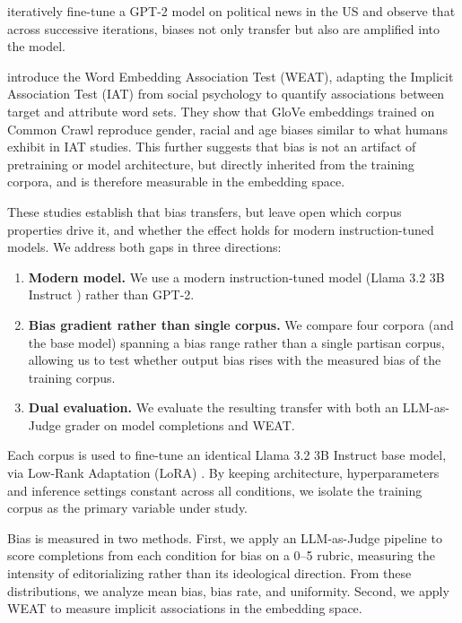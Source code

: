 \documentclass[11pt]{article}
\begin{document}
\citet{wang2024bias} iteratively fine-tune a GPT-2 model on political news in the US and observe that across successive iterations, biases not only transfer but also are amplified into the model.

\citet{caliskan2017} introduce the Word Embedding Association Test (WEAT), adapting the Implicit Association Test (IAT) from social psychology to quantify associations between target and attribute word sets.
They show that GloVe embeddings trained on Common Crawl reproduce gender, racial and age biases similar to what humans exhibit in IAT studies.
This further suggests that bias is not an artifact of pretraining or model architecture, but directly inherited from the training corpora, and is therefore measurable in the embedding space. 

These studies establish that bias transfers, but leave open which corpus properties drive it, and whether the effect holds for modern instruction-tuned models.
We address both gaps in three directions:
\begin{enumerate}
  \item \textbf{Modern model.} We use a modern instruction-tuned model (Llama 3.2 3B Instruct \cite{meta2024llama32}) rather than GPT-2.
  \item \textbf{Bias gradient rather than single corpus.} We compare four corpora (and the base model) spanning a bias range rather than a single partisan corpus, allowing us to test whether output bias rises with the measured bias of the training corpus.
  \item \textbf{Dual evaluation.} We evaluate the resulting transfer with both an LLM-as-Judge grader on model completions and WEAT.
\end{enumerate}

Each corpus is used to fine-tune an identical Llama 3.2 3B Instruct \cite{meta2024llama32} base model, via Low-Rank Adaptation (LoRA) \cite{hu2021lora}. 
By keeping architecture, hyperparameters and inference settings constant across all conditions, we isolate the training corpus as the primary variable under study.


Bias is measured in two methods. 
First, we apply an LLM-as-Judge pipeline \cite{zheng2023judge} to score completions from each condition for bias on a 0--5 rubric, measuring the intensity of editorializing rather than its ideological direction.
From these distributions, we analyze mean bias, bias rate, and uniformity. 
Second, we apply WEAT to measure implicit associations in the embedding space.
\end{document}
